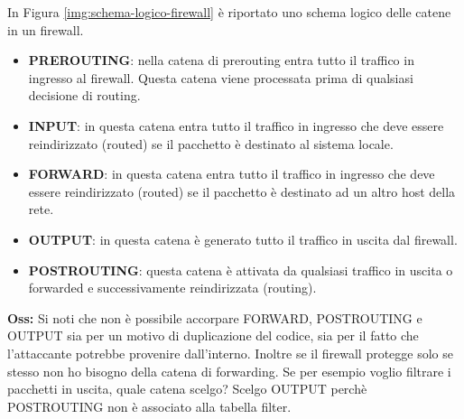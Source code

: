 \newpage
In Figura \ref{img:schema-logico-firewall} è riportato uno schema logico delle catene in un firewall. 
\begin{itemize}
\item \textbf{PREROUTING}: nella catena di prerouting entra tutto il traffico in ingresso al firewall. Questa catena viene processata prima di qualsiasi decisione di routing.
\item \textbf{INPUT}: in questa catena entra tutto il traffico in ingresso che deve essere reindirizzato (routed) se il pacchetto è destinato al sistema locale.
\item \textbf{FORWARD}: in questa catena entra tutto il traffico in ingresso che deve essere reindirizzato (routed) se il pacchetto è destinato ad un altro host della rete. 
\item \textbf{OUTPUT}: in questa catena è generato tutto il traffico in uscita dal firewall.
\item \textbf{POSTROUTING}: questa catena è attivata da qualsiasi traffico in uscita o forwarded e successivamente reindirizzata (routing).
\end{itemize}

\textbf{Oss:} Si noti che non è possibile accorpare FORWARD, POSTROUTING e OUTPUT sia per un motivo di duplicazione del codice, sia per il fatto che l'attaccante potrebbe provenire dall'interno. Inoltre se il firewall protegge solo se stesso non ho bisogno della catena di forwarding. Se per esempio voglio filtrare i pacchetti in uscita, quale catena scelgo? Scelgo OUTPUT perchè POSTROUTING non è associato alla tabella filter.\\

